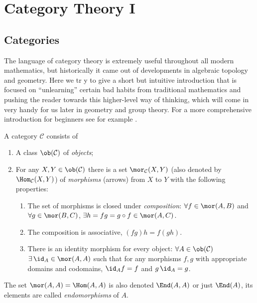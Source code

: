 \section{Category Theory I}


\subsection{Categories}


\begin{defn}[Categories]

The language of category theory is extremely useful throughout all modern mathematics, but historically it came out of developments in algebraic topology and geometry. Here we tr
y to give a short but intuitive introduction that is focused on ``unlearning'' certain bad habits from traditional mathematics and pushing the reader towards this higher-level way of thinking, which will come in very handy for us later in geometry and group theory. For a more comprehensive introduction for beginners see for example \cite{Leinster, Perrone}.

A category $\mathcal{C}$ consists of
\begin{enumerate}
\item A class $\ob(\mathcal{C})$ of \emph{objects};
\item For any $X,Y\in\ob(\mathcal{C})$ there is a set $\mor_{\mathcal{C}}(X,Y)$ (also denoted by $\Hom_{\mathcal{C}}(X,Y)$) of \emph{morphisms} (arrows) from $X$ to $Y$ with the following properties:
\begin{enumerate}
\item The set of morphisms is closed under \emph{composition}: $\forall f\in\mor(A,B)$
and $\forall g\in\mor(B,C)$, $\exists h=fg=g\circ f\in\mor(A,C)$.
\item The composition is associative, $\left(fg\right)h=f\left(gh\right)$.
\item There is an identity morphism for every object: $\forall A\in\ob(\mathcal{C})$
$\exists\,\id_{A}\in\mor(A,A)$ such that for any morphisms $f,g$ with
appropriate domains and codomains, $\id_{A}f=f$ and $g\,\id_{A}=g$.
\end{enumerate}
\end{enumerate}
The set $\mor(A,A)=\Hom(A,A)$ is also denoted $\End(A,A)$ or just $\End(A)$, its elements are called \emph{endomorphisms} of $A$.
\end{defn}

